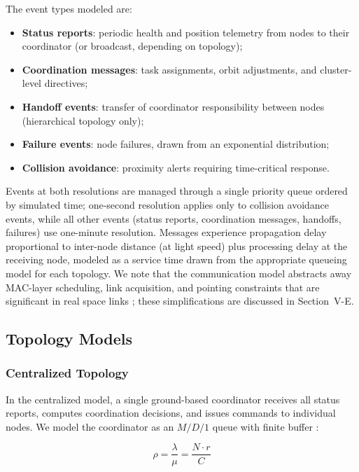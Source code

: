 \documentclass[journal]{IEEEtran}
\begin{document}
The event types modeled are:
\begin{itemize}
    \item \textbf{Status reports}: periodic health and position telemetry from nodes to their coordinator (or broadcast, depending on topology);
    \item \textbf{Coordination messages}: task assignments, orbit adjustments, and cluster-level directives;
    \item \textbf{Handoff events}: transfer of coordinator responsibility between nodes (hierarchical topology only);
    \item \textbf{Failure events}: node failures, drawn from an exponential distribution;
    \item \textbf{Collision avoidance}: proximity alerts requiring time-critical response.
\end{itemize}

Events at both resolutions are managed through a single priority queue ordered by simulated time; one-second resolution applies only to collision avoidance events, while all other events (status reports, coordination messages, handoffs, failures) use one-minute resolution. Messages experience propagation delay proportional to inter-node distance (at light speed) plus processing delay at the receiving node, modeled as a service time drawn from the appropriate queueing model for each topology. We note that the communication model abstracts away MAC-layer scheduling, link acquisition, and pointing constraints that are significant in real space links \cite{ccsds_prox1}; these simplifications are discussed in Section~V-E.

\subsection{Topology Models}

\subsubsection{Centralized Topology}

In the centralized model, a single ground-based coordinator receives all status reports, computes coordination decisions, and issues commands to individual nodes. We model the coordinator as an $M/D/1$ queue with finite buffer \cite{kleinrock_queueing}:

\begin{equation}
    \rho = \frac{\lambda}{\mu} = \frac{N \cdot r}{C}
    \label{eq:centralized_utilization}
\end{equation}
\end{document}
